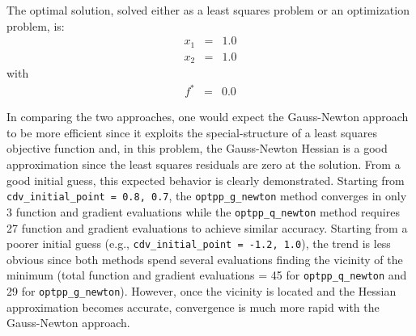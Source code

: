 The optimal solution, solved either as a least squares problem or an
optimization problem, is:
\begin{eqnarray*}
    x_1 &=& 1.0 \\
    x_2 &=& 1.0
\end{eqnarray*}
with
\begin{eqnarray*}
    f^{\ast} &=& 0.0
\end{eqnarray*}

In comparing the two approaches, one would expect the Gauss-Newton
approach to be more efficient since it exploits the special-structure
of a least squares objective function and, in this problem, the
Gauss-Newton Hessian is a good approximation since the least squares
residuals are zero at the solution.  From a good initial guess, this
expected behavior is clearly demonstrated. Starting from
\texttt{cdv\_initial\_point = 0.8, 0.7}, the \texttt{optpp\_g\_newton}
method converges in only 3 function and gradient evaluations while the
\texttt{optpp\_q\_newton} method requires 27 function and gradient
evaluations to achieve similar accuracy. Starting from a poorer
initial guess (e.g., \texttt{cdv\_initial\_point = -1.2, 1.0}), the
trend is less obvious since both methods spend several evaluations
finding the vicinity of the minimum (total function and gradient
evaluations = 45 for \texttt{optpp\_q\_newton} and 29 for
\texttt{optpp\_g\_newton}).  However, once the vicinity is located and
the Hessian approximation becomes accurate, convergence is much more
rapid with the Gauss-Newton approach.

